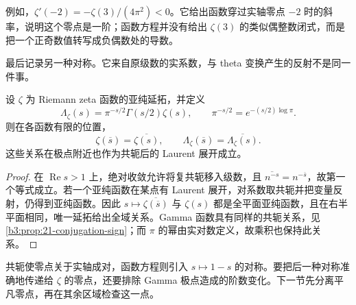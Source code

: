 例如，\(\zeta'(-2)=-\zeta(3)/(4\pi^2)<0\)。它给出函数穿过实轴零点 \(-2\) 时的斜率，说明这个零点是一阶；函数方程并没有给出 \(\zeta(3)\) 的类似偶整数闭式，而是把一个正奇数值转写成负偶数处的导数。

最后记录另一种对称。它来自原级数的实系数，与 theta 变换产生的反射不是同一件事。

\begin{proposition}[共轭对称]\label{b3:prop:26-conjugation}
设 \(\zeta\) 为 Riemann zeta 函数的亚纯延拓，并定义
\[
 \Lambda_\zeta(s)=\pi^{-s/2}\Gamma(s/2)\zeta(s),
 \qquad \pi^{-s/2}=e^{-(s/2)\log\pi}.
\]
则在各函数有限的位置，
\[
 \zeta(\overline s)=\overline{\zeta(s)},\qquad
 \Lambda_\zeta(\overline s)=\overline{\Lambda_\zeta(s)}.
\]
这些关系在极点附近也作为共轭后的 Laurent 展开成立。
\end{proposition}
\begin{proof}
在 \(\operatorname{Re}s>1\) 上，绝对收敛允许将复共轭移入级数，且 \(\overline{n^{-s}}=n^{-\overline s}\)，故第一个等式成立。若一个亚纯函数在某点有 Laurent 展开，对系数取共轭并把变量反射，仍得到亚纯函数。因此 \(s\mapsto\overline{\zeta(\overline s)}\) 与 \(\zeta(s)\) 都是全平面亚纯函数，且在右半平面相同，唯一延拓给出全域关系。Gamma 函数具有同样的共轭关系，见\cref{b3:prop:21-conjugation-sign}；而 \(\pi\) 的幂由实对数定义，故乘积也保持此关系。
\end{proof}

共轭使零点关于实轴成对，函数方程则引入 \(s\mapsto1-s\) 的对称。要把后一种对称准确地传递给 \(\zeta\) 的零点，还要排除 Gamma 极点造成的阶数变化。下一节先分离平凡零点，再在其余区域检查这一点。
